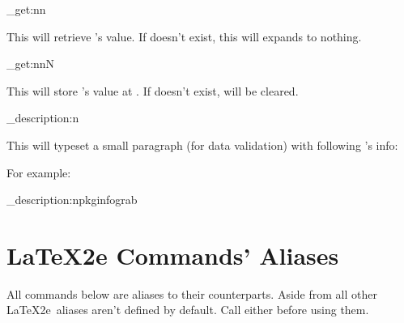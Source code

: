 \documentclass[10pt]{article}
\begin{document}
\begin{codedescribe}{\pkginfograb_get:nn}
\begin{codesyntax}%
\end{codesyntax}
This will retrieve 's value. If  doesn't exist, this will expands to nothing.
\end{codedescribe}

\begin{codedescribe}{\pkginfograb_get:nnN}
\begin{codesyntax}%
\end{codesyntax}
This will store 's value at . If  doesn't exist,  will be cleared.
\end{codedescribe}




\begin{codedescribe}{\pkginfograb_description:n}
\begin{codesyntax}%
\end{codesyntax}
This will typeset a small paragraph (for data validation) with following 's info: 
\end{codedescribe}
For example:
\begin{codestore}[demoD]
\ExplSyntaxOn
\pkginfograb_description:n{pkginfograb}
\ExplSyntaxOff
\end{codestore}




\section{LaTeX2e Commands' Aliases}\label{2e-cmds}
All commands below are aliases to their  counterparts. Aside from \tsobj{\PkgInfoSetAliases} all other \LaTeX2e\ aliases aren't defined by default. Call either  before using them.
\end{document}
